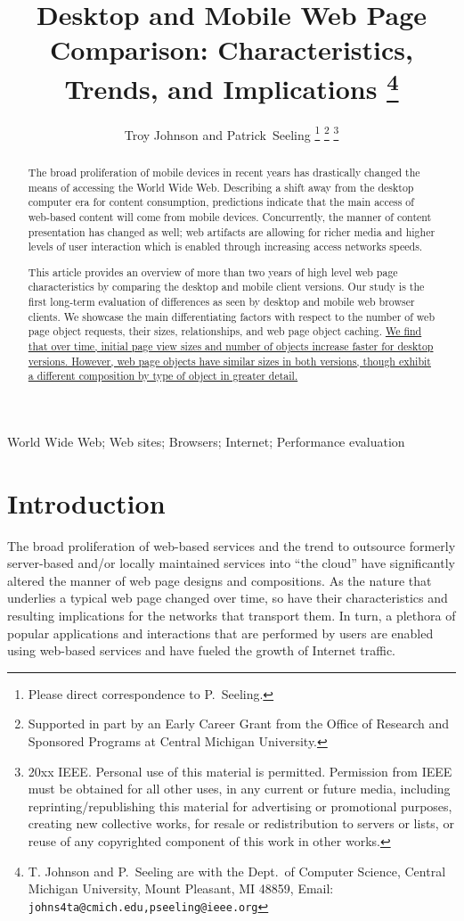 \documentclass[onecolumn,12pt]{IEEEtran}
\title{Desktop and Mobile Web Page Comparison: Characteristics, Trends, and Implications
	\thanks{T. Johnson and P.~Seeling are with the Dept.~of Computer Science,
		Central Michigan University, Mount Pleasant, MI 48859, Email: \texttt{johns4ta@cmich.edu,pseeling@ieee.org}}
}
\author{Troy Johnson and Patrick~Seeling
	\thanks{Please direct correspondence to P.~Seeling.}
	\thanks{Supported in part by an Early Career Grant from the Office of Research and Sponsored Programs at Central Michigan University.}
	\thanks{\textcopyright 20xx IEEE. Personal use of this material is permitted. Permission from IEEE must be obtained for all other uses, in any current or future media, including reprinting/republishing this material for advertising or promotional purposes, creating new collective works, for resale or redistribution to servers or lists, or reuse of any copyrighted component of this work in other works.}
}
\begin{document}
\maketitle

\begin{abstract}\boldmath
The broad proliferation of mobile devices in recent years has drastically changed the means of accessing the World Wide Web.
Describing a shift away from the desktop computer era for content consumption, predictions indicate that the main access of web-based content will come from mobile devices.
Concurrently, the manner of content presentation has changed as well; web artifacts are allowing for richer media and higher levels of user interaction which is enabled through increasing access networks speeds.

This article provides an overview of more than two years of high level web page characteristics by comparing the desktop and mobile client versions.
Our study is the first long-term evaluation of differences as seen by desktop and mobile web browser clients.
We showcase the main differentiating factors with respect to the number of web page object requests, their sizes, relationships, and web page object caching. \uline{We find that over time, initial page view sizes and number of objects increase faster for desktop versions. However, web page objects have similar sizes in both versions, though exhibit a different composition by type of object in greater detail.}

\end{abstract}

\begin{IEEEkeywords}
World Wide Web; Web sites; Browsers; Internet; Performance evaluation
\end{IEEEkeywords}


\section{Introduction} 
\label{s:intro}

The broad proliferation of web-based services and the trend to outsource formerly server-based and/or locally maintained services into ``the cloud'' have significantly altered the manner of web page designs and compositions.
As the nature that underlies a typical web page changed over time, so have their characteristics and resulting implications for the networks that transport them.
In turn, a plethora of popular applications and interactions that are performed by users are enabled using web-based services and have fueled the growth of Internet traffic.
\end{document}
